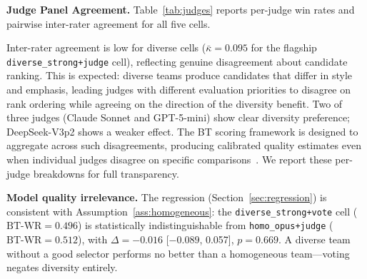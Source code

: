 \documentclass[10pt,twocolumn]{article}
\theoremstyle{remark}
\begin{document}
\textbf{Judge Panel Agreement.}
Table~\ref{tab:judges} reports per-judge win rates and pairwise inter-rater agreement for all five cells.

\begin{table}[t]
\caption{Per-judge win rates by cell. $\bar{\kappa}$ is the mean pairwise Cohen's $\kappa$ measuring inter-rater agreement.}
\label{tab:judges}
\centering
{}%
\end{table}

Inter-rater agreement is low for diverse cells ($\bar{\kappa} = 0.095$ for the flagship \texttt{diverse\_strong+judge} cell), reflecting genuine disagreement about candidate ranking. This is expected: diverse teams produce candidates that differ in style and emphasis, leading judges with different evaluation priorities to disagree on rank ordering while agreeing on the direction of the diversity benefit. Two of three judges (Claude Sonnet and GPT-5-mini) show clear diversity preference; DeepSeek-V3p2 shows a weaker effect. The BT scoring framework is designed to aggregate across such disagreements, producing calibrated quality estimates even when individual judges disagree on specific comparisons~\citep{zheng2023judging}. We report these per-judge breakdowns for full transparency.

\textbf{Model quality irrelevance.} The regression (Section~\ref{sec:regression}) is consistent with Assumption~\ref{ass:homogeneous}: the \texttt{diverse\_strong+vote} cell ($\mathrm{BT\text{-}WR} = 0.496$) is statistically indistinguishable from \texttt{homo\_opus+judge} ($\mathrm{BT\text{-}WR} = 0.512$), with $\Delta = -0.016$ [$-0.089$, 0.057], $p = 0.669$. A diverse team without a good selector performs no better than a homogeneous team---voting negates diversity entirely.
\end{document}
